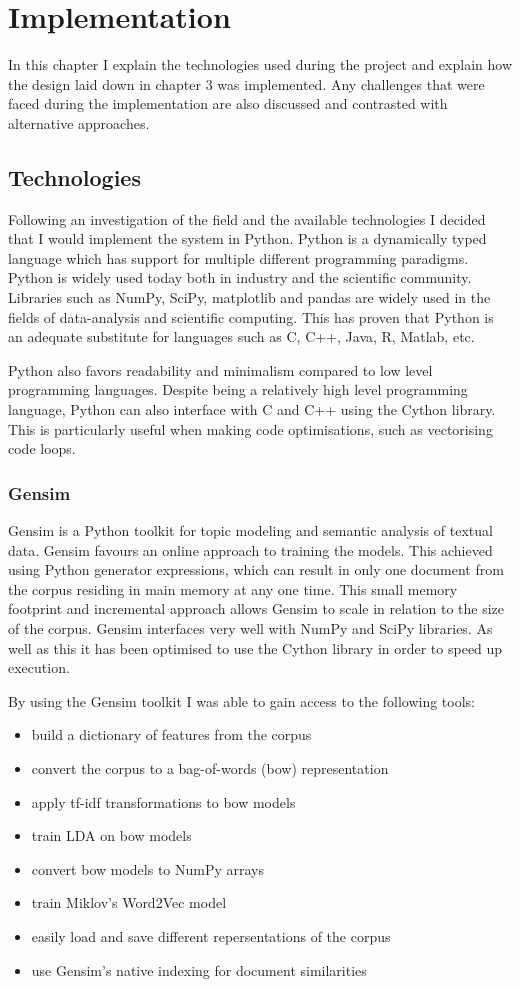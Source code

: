 \chapter{Implementation}

In this chapter I explain the technologies used during the project and explain how the design laid down in chapter 3 was implemented.
Any challenges that were faced during the implementation are also discussed and contrasted with alternative approaches.

\section{Technologies}
Following an investigation of the field and the available technologies I decided that I would implement the system in Python.
Python is a dynamically typed language which has support for multiple different programming paradigms.
Python is widely used today both in industry and the scientific community.
Libraries such as NumPy, SciPy, matplotlib and pandas are widely used in the fields of data-analysis and scientific computing.
This has proven that Python is an adequate substitute for languages such as C, C++, Java, R, Matlab, etc.

Python also favors readability and minimalism compared to low level programming languages.
Despite being a relatively high level programming language, Python can also interface with C and C++ using the Cython library.
This is particularly useful when making code optimisations, such as vectorising code loops.

\subsection{Gensim}
Gensim is a Python toolkit for topic modeling and semantic analysis of textual data.
Gensim favours an online approach to training the models.
This achieved using Python generator expressions, which can result in only one document from the corpus residing in main memory at any one time.
This small memory footprint and incremental approach allows Gensim to scale in relation to the size of the corpus.
Gensim interfaces very well with NumPy and SciPy libraries.
As well as this it has been optimised to use the Cython library in order to speed up execution.

By using the Gensim toolkit I was able to gain access to the following tools:
\begin{itemize}
    \item build a dictionary of features from the corpus
    \item convert the corpus to a bag-of-words (bow) representation
    \item apply tf-idf transformations to bow models
    \item train LDA on bow models
    \item convert bow models to NumPy arrays
    \item train Miklov's Word2Vec model
    \item easily load and save different repersentations of the corpus
    \item use Gensim's native indexing for document similarities
\end{itemize}

